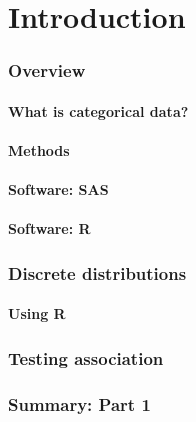 \renewcommand{\FileName}{part1}
\part{Introduction}


\section{Overview}

\subsection{What is categorical data?}

\subsection{Methods}

\subsection{Software: SAS}

\subsection{Software: R}

\section{Discrete distributions}

\subsection{Using R}

\section{Testing association}

\section{Summary: Part 1}


\endinput
